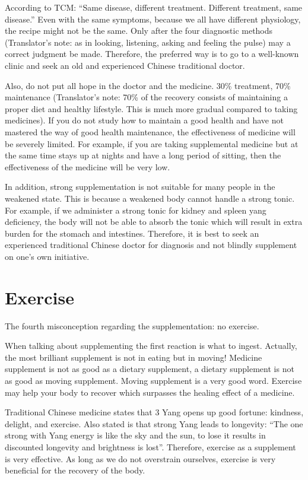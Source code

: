 \documentclass[
]{book}
\begin{document}
According to TCM: ``Same disease, different treatment. Different treatment, same disease.'' Even with the same symptoms, because we all have different physiology, the recipe might not be the same. Only after the four diagnostic methods (Translator's note: as in looking, listening, asking and feeling the pulse) may a correct judgment be made. Therefore, the preferred way is to go to a well-known clinic and seek an old and experienced Chinese traditional doctor.

Also, do not put all hope in the doctor and the medicine. 30\% treatment, 70\% maintenance (Translator's note: 70\% of the recovery consists of maintaining a proper diet and healthy lifestyle. This is much more gradual compared to taking medicines). If you do not study how to maintain a good health and have not mastered the way of good health maintenance, the effectiveness of medicine will be severely limited. For example, if you are taking supplemental medicine but at the same time stays up at nights and have a long period of sitting, then the effectiveness of the medicine will be very low.

In addition, strong supplementation is not suitable for many people in the weakened state. This is because a weakened body cannot handle a strong tonic. For example, if we administer a strong tonic for kidney and spleen yang deficiency, the body will not be able to absorb the tonic which will result in extra burden for the stomach and intestines. Therefore, it is best to seek an experienced traditional Chinese doctor for diagnosis and not blindly supplement on one's own initiative.

\hypertarget{exercise}{%
\section{Exercise}\label{exercise}}

The fourth misconception regarding the supplementation: no exercise.

When talking about supplementing the first reaction is what to ingest. Actually, the most brilliant supplement is not in eating but in moving! Medicine supplement is not as good as a dietary supplement, a dietary supplement is not as good as moving supplement. Moving supplement is a very good word. Exercise may help your body to recover which surpasses the healing effect of a medicine.

Traditional Chinese medicine states that 3 Yang opens up good fortune: kindness, delight, and exercise. Also stated is that strong Yang leads to longevity: ``The one strong with Yang energy is like the sky and the sun, to lose it results in discounted longevity and brightness is lost''. Therefore, exercise as a supplement is very effective. As long as we do not overstrain ourselves, exercise is very beneficial for the recovery of the body.
\end{document}
